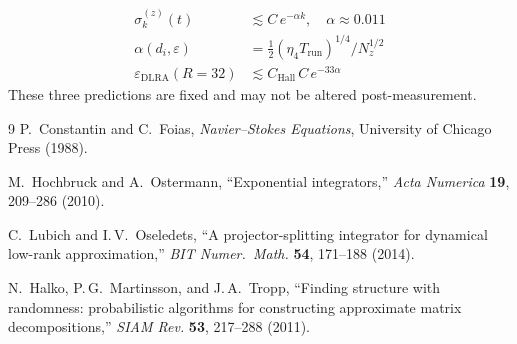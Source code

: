 \documentclass[12pt, a4paper]{article}
\newcommand{\di}{d_i}
\newcommand{\eps}{\varepsilon}
\newcommand{\sigk}{\sigma_k}
\begin{document}
\begin{tcolorbox}[colback=blue!5, colframe=blue!60!black, title=Sealed analytical predictions (Phase~0)]
\begin{align}
  \sigk^{(z)}(t) &\lesssim C\,e^{-\alpha k},
  \quad \alpha \approx 0.011 \tag{P1}\label{pred:decay} \\[4pt]
  \alpha(\di,\eps) &= \tfrac{1}{2}(\eta_4 T_\mathrm{run})^{1/4} / N_z^{1/2}
  \tag{P2}\label{pred:alpha} \\[4pt]
  \eps_\mathrm{DLRA}(R=32) &\lesssim C_\mathrm{Hall}\,C\,e^{-33\alpha}
  \tag{P3}\label{pred:dlra}
\end{align}
These three predictions are fixed and may not be altered post-measurement.
\end{tcolorbox}

\begin{thebibliography}{9}
P.~Constantin and C.~Foias,
\textit{Navier--Stokes Equations},
University of Chicago Press (1988).

M.~Hochbruck and A.~Ostermann,
``Exponential integrators,''
\textit{Acta Numerica} \textbf{19}, 209--286 (2010).

C.~Lubich and I.\,V.~Oseledets,
``A projector-splitting integrator for dynamical low-rank approximation,''
\textit{BIT Numer.\ Math.} \textbf{54}, 171--188 (2014).

N.~Halko, P.\,G.~Martinsson, and J.\,A.~Tropp,
``Finding structure with randomness: probabilistic algorithms
for constructing approximate matrix decompositions,''
\textit{SIAM Rev.} \textbf{53}, 217--288 (2011).
\end{thebibliography}
\end{document}
